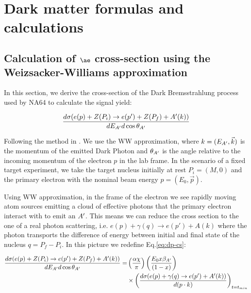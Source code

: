
\newcommand{\appdira}{appendices/plots/appendixA}

\chapter{Dark matter formulas and calculations}

\label{AppendixA}

\section{Calculation of $\ae$ cross-section using the Weizsacker-Williams approximation}
\label{appA:sec:cross-section-wz}

In this section, we derive the cross-section of the Dark Bremsstrahlung process used by NA64 to calculate the signal yield:

\begin{equation}
  \label{eq:dp-cs}
  \frac{d\sigma(e(p) + Z(P_i) \to e(p') + Z(P_f) + A'(k))}{dE_{A'}d\cos{\theta_{A'}}}
\end{equation}

Following the method in \cite{jdb}. We use the WW approximation, where $k=(E_{A'},\vec{k})$ is the momentum of the emitted Dark Photon and $\theta_{A'}$ is the angle relative to the incoming momentum of the electron $p$ in the lab frame. In the scenario of a fixed target experiment, we take the target nucleus initially at rest $P_i = (M,0)$ and the primary electron with the nominal beam energy $p = (E_0, \vec{p})$.

Using WW approximation, in the frame of the electron we see rapidly moving atom sources emitting a cloud of effective photons that the primary electron interact with to emit an $A'$. This means we can reduce the cross section to the one of a real photon scattering, i.e. $e(p) + \gamma(q) \to e(p') + A(k)$ where the photon transports the difference of energy between initial and final state of the nucleus $q = P_f - P_i$. In this picture we redefine Eq.\ref{eq:dp-cs}:

\begin{equation}
  \label{eq:dp-cs-ww}
  \begin{aligned}
    \frac{d\sigma(e(p) + Z(P_i) \to e(p') + Z(P_f) + A'(k))}{dE_{A'}d\cos{\theta_{A'}}} = &\left(\frac{\alpha \chi}{\pi} \right) \left(\frac{E_0 x \beta_{A'}}{(1 - x)} \right) \\
    &\times \left( \frac{d\sigma(e(p) + \gamma(q) \to e(p') + A'(k))}{d(p \cdot k)} \right)_{t = t_{min}}
   \end{aligned}
 \end{equation}

